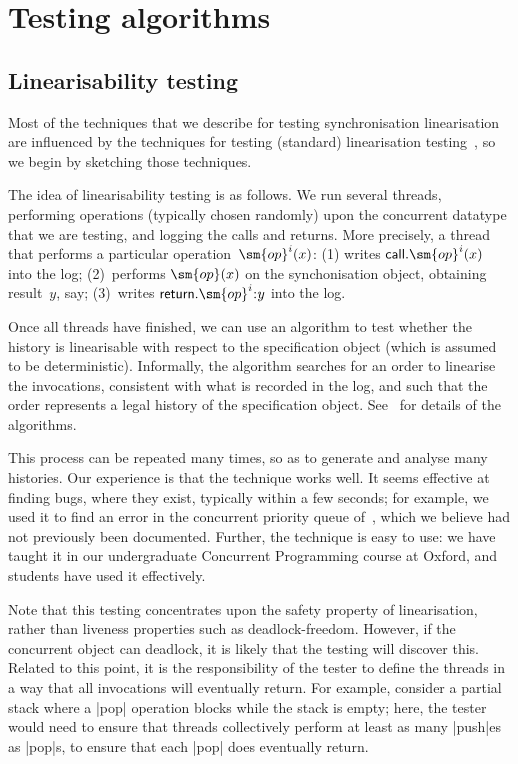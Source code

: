 \section{Testing algorithms}


\subsection{Linearisability testing}

Most of the techniques that we describe for testing synchronisation
linearisation are influenced by the techniques for testing (standard)
linearisation testing~\cite{gavin:lin-testing}, so we begin by sketching those
techniques. 

The idea of linearisability testing is as follows.  We run several threads,
performing operations (typically chosen randomly) upon the concurrent datatype
that we are testing, and logging the calls and returns.  More precisely, a
thread that performs a particular operation~$\sm{op}^i(x)$: (1) writes
$\call.\sm{op}^i(x)$ into the log; (2)~performs $\sm{op}(x)$ on the
synchonisation object, obtaining result~$y$, say; (3)~writes $\return.\sm{op}^i
\:: y$ into the log.  

Once all threads have finished, we can use an algorithm to test whether the
history is linearisable with respect to the specification object (which is
assumed to be deterministic).  Informally, the algorithm searches for an order
to linearise the invocations, consistent with what is recorded in the log, and
such that the order represents a legal history of the specification object.
See~\cite{gavin:lin-testing} for details of the algorithms.

This process can be repeated many times, so as to generate and analyse many
histories.  Our experience is that the technique works well.  It seems
effective at finding bugs, where they exist, typically within a few seconds;
for example, we used it to find an error in the concurrent priority queue
of~\cite{faulty-pri-queue}, which we believe had not previously been
documented.  Further, the technique is easy to use: we have taught it in our
undergraduate Concurrent Programming course at Oxford, and students have used
it effectively.

Note that this testing concentrates upon the safety property of linearisation,
rather than liveness properties such as deadlock-freedom.  However, if the
concurrent object can deadlock, it is likely that the testing will discover
this.  Related to this point, it is the responsibility of the tester to define
the threads in a way that all invocations will eventually return.  For
example, consider a partial stack where a |pop| operation blocks while the
stack is empty; here, the tester would need to ensure that threads
collectively perform at least as many |push|es as |pop|s, to ensure that each
|pop| does eventually return. 

